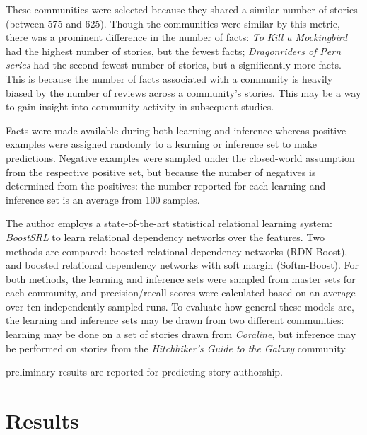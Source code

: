 \documentclass[letterpaper]{article}
\begin{document}
These communities were selected because they shared a similar number of stories (between 575 and 625). Though the communities were similar by this metric, there was a prominent difference in the number of facts: \textit{To Kill a Mockingbird} had the highest number of stories, but the fewest facts; \textit{Dragonriders of Pern series} had the second-fewest number of stories, but a significantly more facts. This is because the number of facts associated with a community is heavily biased by the number of reviews across a community's stories. This may be a way to gain insight into community activity in subsequent studies.

Facts were made available during both learning and inference whereas positive examples were assigned randomly to a learning or inference set to make predictions.  Negative examples were sampled under the closed-world assumption from the respective positive set, but because the number of negatives is determined from the positives: the number reported for each learning and inference set is an average from 100 samples.

The author employs a state-of-the-art statistical relational learning system: \textit{BoostSRL} to learn relational dependency networks over the features. Two methods are compared: boosted relational dependency networks (RDN-Boost), and boosted relational dependency networks with soft margin (Softm-Boost). For both methods, the learning and inference sets were sampled from master sets for each community, and precision/recall scores were calculated based on an average over ten independently sampled runs. To evaluate how general these models are, the learning and inference sets may be drawn from two different communities: learning may be done on a set of stories drawn from \textit{Coraline}, but inference may be performed on stories from the \textit{Hitchhiker's Guide to the Galaxy} community.


preliminary results are reported for predicting story authorship.



\section{Results}

\end{document}
